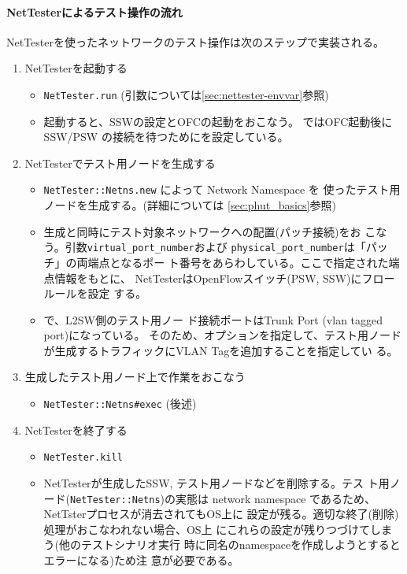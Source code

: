     \paragraph{NetTesterによるテスト操作の流れ}
NetTesterを使ったネットワークのテスト操作は次のステップで実装される。
\begin{enumerate}
 \item NetTesterを起動する
       \begin{itemize}
        \item \verb|NetTester.run| (引数については\ref{sec:nettester-envvar}参照)
        \item 起動すると、SSWの設定とOFCの起動をおこなう。
              ではOFC起動後にSSW/PSW
              の接続を待つためにを設定している。
       \end{itemize}
 \item NetTesterでテスト用ノードを生成する
       \begin{itemize}
        \item \verb|NetTester::Netns.new| によって Network Namespace を
              使ったテスト用ノードを生成する。(詳細については
              \ref{sec:phut_basics}参照)
        \item 生成と同時にテスト対象ネットワークへの配置(パッチ接続)をお
              こなう。引数\verb|virtual_port_number|および
              \verb|physical_port_number|は「パッチ」の両端点となるポー
              ト番号をあらわしている。ここで指定された端点情報をもとに、
              NetTesterはOpenFlowスイッチ(PSW, SSW)にフロールールを設定
              する。
        \item {}で、L2SW側のテスト用ノー
              ド接続ポートはTrunk Port (vlan tagged port)になっている。
              そのため、オプションを指定して、テスト用ノード
              が生成するトラフィックにVLAN Tagを追加することを指定してい
              る。
       \end{itemize}
 \item 生成したテスト用ノード上で作業をおこなう
       \begin{itemize}
        \item \verb|NetTester::Netns#exec| (後述)
       \end{itemize}
 \item NetTesterを終了する
       \begin{itemize}
        \item \verb|NetTester.kill|
        \item NetTesterが生成したSSW, テスト用ノードなどを削除する。テス
              ト用ノード(\verb|NetTester::Netns|)の実態は network
              namespace であるため、NetTsterプロセスが消去されてもOS上に
              設定が残る。適切な終了(削除)処理がおこなわれない場合、OS上
              にこれらの設定が残りつづけてしまう(他のテストシナリオ実行
              時に同名のnamespaceを作成しようとするとエラーになる)ため注
              意が必要である。
       \end{itemize}
\end{enumerate}

